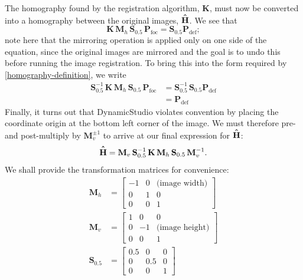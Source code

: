 \documentclass[10pt]{book}
\newcommand*{\Hhat}{\hat{\vphantom{\scalebox{1.2}{H}} H}}
\begin{document}
The homography found by the registration algorithm, $\mathbf{K}$, must now be
converted into a homography between the original images, $\mathbf{\Hhat}$. We
see that
\begin{equation}
    \mathbf{K}\, \mathbf{M}_h\, \mathbf{S}_{0.5}\, \mathbf{P}_\text{foc} =
    \mathbf{S}_{0.5} \mathbf{P}_\text{def};
\end{equation}
note here that the mirroring operation is applied only on one side of the
equation, since the original images are mirrored and the goal is to undo this
before running the image registration. To bring this into the form required by
\eqref{homography-definition}, we write
\begin{align}
    \mathbf{S}_{0.5}^{-1}\, \mathbf{K}\, \mathbf{M}_h\, \mathbf{S}_{0.5}\,
    \mathbf{P}_\text{foc} &=
     \mathbf{S}_{0.5}^{-1}\, \mathbf{S}_{0.5} \mathbf{P}_\text{def} \\
     &= \mathbf{P}_\text{def}
 \end{align}
Finally, it turns out that DynamicStudio violates convention by placing the
coordinate origin at the bottom left corner of the image. We must therefore 
pre- and post-multiply by $\mathbf{M}_v^{\pm 1}$ to arrive at our final
expression for $\mathbf{\Hhat}$:
\begin{equation}
    \mathbf{\Hhat} = \mathbf{M}_v\, \mathbf{S}_{0.5}^{-1}\, \mathbf{K}\,
    \mathbf{M}_h\, \mathbf{S}_{0.5}\, \mathbf{M}_v^{-1}.
\end{equation}
We shall provide the transformation matrices for convenience:
\begin{align}
    \mathbf{M}_h &= \left[ \begin{array}{ccc}
    -1 & 0 & \text{(image width)} \\
            0 & 1 & 0 \\
            0 & 0 & 1
    \end{array} \right] \\
    \mathbf{M}_v &= \left[ \begin{array}{ccc}
            1 & 0 & 0 \\
    0 & -1 & \text{(image height)} \\
            0 & 0 & 1
    \end{array} \right] \\
    \mathbf{S}_{0.5} &= \left[ \begin{array}{ccc}
            0.5 & 0 & 0 \\
    0 & 0.5 & 0 \\
            0 & 0 & 1
    \end{array} \right]
\end{align}
  
\end{document}
